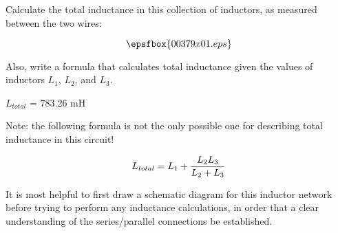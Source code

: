 

Calculate the total inductance in this collection of inductors, as measured between the two wires:

$$\epsfbox{00379x01.eps}$$

Also, write a formula that calculates total inductance given the values of inductors $L_1$, $L_2$, and $L_3$.







$L_{total}$ = 783.26 mH

\vskip 10pt

Note: the following formula is not the only possible one for describing total inductance in this circuit!

$$L_{total} = L_1 + {{L_2 L_3} \over {L_2 + L_3}}$$







It is most helpful to first draw a schematic diagram for this inductor network before trying to perform any inductance calculations, in order that a clear understanding of the series/parallel connections be established.




